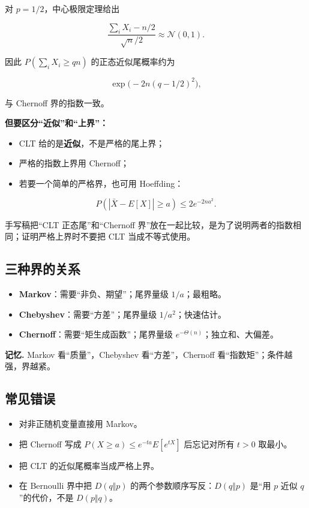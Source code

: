 对 $p=1/2$，中心极限定理给出

\[
\frac{\sum_iX_i-n/2}{\sqrt{n}/2}
\approx \mathcal N(0,1).
\]

因此 $P(\sum_iX_i\ge qn)$ 的正态近似尾概率约为

\[
\exp\bigl(-2n(q-1/2)^2\bigr),
\]

与 Chernoff 界的指数一致。

\textbf{但要区分“近似”和“上界”：}

\begin{itemize}
\item CLT 给的是\textbf{近似}，不是严格的尾上界；
\item 严格的指数上界用 Chernoff；
\item 若要一个简单的严格界，也可用 Hoeffding：
\end{itemize}

\[
  P(|\bar X-E[X]|\ge a)\le2e^{-2na^2}.
\]

手写稿把“CLT 正态尾”和“Chernoff 界”放在一起比较，是为了说明两者的指数相同；证明严格上界时不要把 CLT 当成不等式使用。

\subsection{三种界的关系}


\begin{itemize}
\item \textbf{Markov}：需要“非负、期望”；尾界量级 $1/a$；最粗略。
\item \textbf{Chebyshev}：需要“方差”；尾界量级 $1/a^2$；快速估计。
\item \textbf{Chernoff}：需要“矩生成函数”；尾界量级 $e^{-\Theta(n)}$；独立和、大偏差。
\end{itemize}


\textbf{记忆.} Markov 看“质量”，Chebyshev 看“方差”，Chernoff 看“指数矩”；条件越强，界越紧。

\subsection{常见错误}


\begin{itemize}
\item 对非正随机变量直接用 Markov。
\item 把 Chernoff 写成 $P(X\ge a)\le e^{-ta}E[e^{tX}]$ 后忘记对所有 $t>0$ 取最小。
\item 把 CLT 的近似尾概率当成严格上界。
\item 在 Bernoulli 界中把 $D(q\Vert p)$ 的两个参数顺序写反：$D(q\Vert p)$ 是“用 $p$ 近似 $q$”的代价，不是 $D(p\Vert q)$。
\end{itemize}
